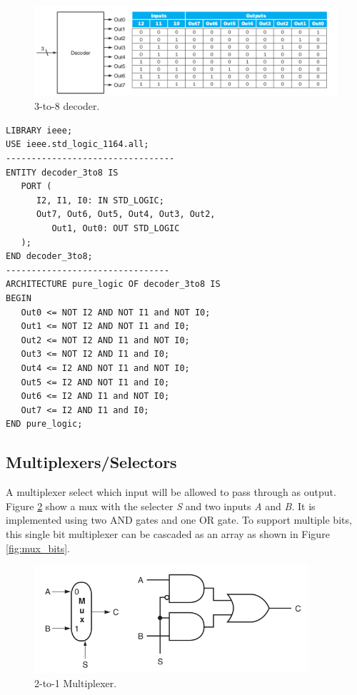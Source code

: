 \documentclass[a4paper, 11pt,oneside]{article}
\begin{document}
\begin{figure}[H]
	\includegraphics[width=\linewidth]{decoder.png}
	\caption{3-to-8 decoder.}
	\label{fig:decoder} 
\end{figure}

\begin{verbatim}
LIBRARY ieee;
USE ieee.std_logic_1164.all;
---------------------------------
ENTITY decoder_3to8 IS
   PORT (
      I2, I1, I0: IN STD_LOGIC;
      Out7, Out6, Out5, Out4, Out3, Out2, 
         Out1, Out0: OUT STD_LOGIC
   );
END decoder_3to8;
--------------------------------
ARCHITECTURE pure_logic OF decoder_3to8 IS
BEGIN
   Out0 <= NOT I2 AND NOT I1 and NOT I0;
   Out1 <= NOT I2 AND NOT I1 and I0;
   Out2 <= NOT I2 AND I1 and NOT I0;
   Out3 <= NOT I2 AND I1 and I0;
   Out4 <= I2 AND NOT I1 and NOT I0;
   Out5 <= I2 AND NOT I1 and I0;
   Out6 <= I2 AND I1 and NOT I0;
   Out7 <= I2 AND I1 and I0;
END pure_logic;
\end{verbatim}


\subsection{Multiplexers/Selectors}
A multiplexer select which input will be allowed to pass through as output. Figure \ref{fig:mux} show a mux with the selecter \textit{S} and two inputs \textit{A} and \textit{B}. It is implemented using two AND gates and one OR gate. To support multiple bits, this single bit multiplexer can be cascaded as an array as shown in Figure \ref{fig:mux_bits}.

\begin{figure}[H]
	\begin{center}
	\includegraphics[width=4in]{mux.png}
	\caption{2-to-1 Multiplexer.}
	\label{fig:mux} 
	\end{center}
\end{figure}
\end{document}
